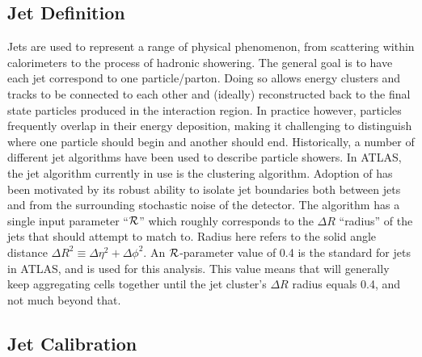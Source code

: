         \subsection{Jet Definition}
            
        Jets are used to represent a range of physical phenomenon,
            from scattering within calorimeters to the process of hadronic showering.
        The general goal is to have each jet correspond to one particle/parton.
        Doing so allows energy clusters and tracks to be connected to each other
            and (ideally) reconstructed back to the final state particles produced in the interaction region.
        In practice however, particles frequently overlap in their energy deposition,
            making it challenging to distinguish where one particle should begin and another should end.
        Historically, a number of different jet algorithms have been used to describe particle showers.
        In ATLAS, the jet algorithm currently in use is the \textit{\antikt} clustering algorithm\cite{anti_kt}.
        Adoption of \antikt has been motivated by its robust ability to isolate jet boundaries both between jets
            and from the surrounding stochastic noise of the detector.
        The \antikt algorithm has a single input parameter ``$\mathcal{R}$'' which roughly corresponds to the $\Delta R$ ``radius''
            of the jets that \antikt should attempt to match to.
        Radius here refers to the solid angle distance 
            $\Delta R^2 \equiv \Delta \eta^2 + \Delta \phi^2$.
        An $\mathcal{R}$-parameter value of 0.4 is the standard for jets in ATLAS, and is used for this analysis.
        This value means that \antikt will generally keep aggregating cells together until the jet cluster's
            $\Delta R$ radius equals 0.4, and not much beyond that.


        \FloatBarrier
        \subsection{Jet Calibration} \label{sec:jet_calibration}

